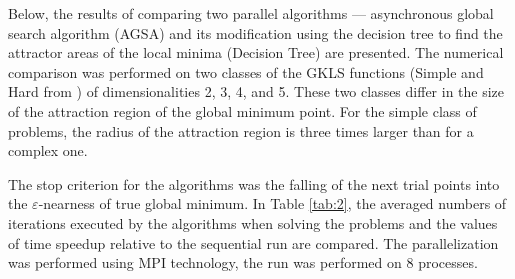 \documentclass{cmi}
\begin{document}
Below, the results of comparing two parallel algorithms --- asynchronous global search algorithm  (AGSA) and its modification using the decision tree to find the attractor areas of the local minima  (Decision Tree) are presented. The numerical comparison was performed on two classes of the GKLS  functions (Simple and Hard from ) of dimensionalities 2, 3, 4, and 5. 
These two classes differ in the size of the attraction region of the global minimum point. 
For the simple class of problems, the radius of the attraction region is three times larger than for a complex one.

The stop  criterion for the algorithms was the falling of the next trial points into the $\varepsilon$-nearness of  true global minimum.  In Table \ref{tab:2}, the averaged numbers of iterations executed by the algorithms when solving the  problems and the values of time speedup relative to the sequential run are compared. The parallelization was performed using MPI technology, the run was performed on 8 processes.
\end{document}
